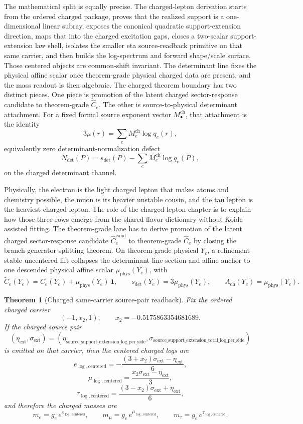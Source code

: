 \documentclass[11pt]{article}
\newtheorem{theorem}{Theorem}[section]
\begin{document}
The mathematical split is equally precise. The charged-lepton derivation starts from
the ordered charged package, proves that the realized support is a one-dimensional linear subray,
exposes the canonical quadratic support-extension direction, maps that into the charged
excitation gaps, closes a two-scalar support-extension law shell, isolates the smaller eta
source-readback primitive on that same carrier, and then builds the log-spectrum and forward
shape/scale surface. Those centered objects are common-shift invariant. The determinant line fixes the physical affine scalar once theorem-grade physical charged data are present, and the mass readout is then algebraic. The charged theorem boundary has two distinct pieces. One piece is promotion of the latent charged sector-response candidate to theorem-grade \(\widehat C_e\). The other is source-to-physical determinant attachment. For a fixed formal source exponent vector \(M_\bullet^{\mathrm{ch}}\), that attachment is the identity
\[
3\mu(r)=\sum_e M_e^{\mathrm{ch}}\log q_e(r),
\]
equivalently zero determinant-normalization defect
\[
N_{\det}(P)=s_{\det}(P)-\sum_e M_e^{\mathrm{ch}}\log q_e(P),
\]
on the charged determinant channel.

Physically, the electron is the light charged lepton that makes atoms and chemistry possible, the
muon is its heavier unstable cousin, and the tau lepton is the heaviest charged lepton. The role
of the charged-lepton chapter is to explain how those three rows emerge from the shared flavor
dictionary without Koide-assisted fitting. The theorem-grade lane has to derive promotion of the
latent charged sector-response candidate \(\widehat C_e^{\mathrm{cand}}\) to theorem-grade
\(\widehat C_e\) by closing the branch-generator splitting theorem. On theorem-grade physical
\(Y_e\), a refinement-stable uncentered lift collapses the determinant-line section and affine
anchor to one descended physical affine scalar \(\mu_{\mathrm{phys}}(Y_e)\), with
\[
\widetilde C_e(Y_e)=\widehat C_e(Y_e)+\mu_{\mathrm{phys}}(Y_e)\,\mathbf 1,
\qquad
s_{\det}(Y_e)=3\mu_{\mathrm{phys}}(Y_e),
\qquad
A_{\mathrm{ch}}(Y_e)=\mu_{\mathrm{phys}}(Y_e).
\]

\begin{theorem}[Charged same-carrier source-pair readback]
Fix the ordered charged carrier
\[
(-1,x_2,1),
\qquad
x_2=-0.5175863354681689.
\]
If the charged source pair
\[
(\eta_{\mathrm{ext}},\sigma_{\mathrm{ext}})
=
(\eta_{\mathrm{source\_support\_extension\_log\_per\_side}},
\sigma_{\mathrm{source\_support\_extension\_total\_log\_per\_side}})
\]
is emitted on that carrier, then the centered charged logs are
\[
e_{\log,\mathrm{centered}}
=
-\frac{(3+x_2)\sigma_{\mathrm{ext}}-\eta_{\mathrm{ext}}}{6},
\]
\[
\mu_{\log,\mathrm{centered}}
=
\frac{x_2\sigma_{\mathrm{ext}}-\eta_{\mathrm{ext}}}{3},
\]
\[
\tau_{\log,\mathrm{centered}}
=
\frac{(3-x_2)\sigma_{\mathrm{ext}}+\eta_{\mathrm{ext}}}{6},
\]
and therefore the charged masses are
\[
m_e = g_e\,e^{e_{\log,\mathrm{centered}}},
\qquad
m_\mu = g_e\,e^{\mu_{\log,\mathrm{centered}}},
\qquad
m_\tau = g_e\,e^{\tau_{\log,\mathrm{centered}}}.
\]
\end{theorem}
\end{document}
